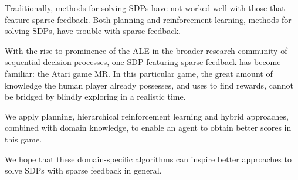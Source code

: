 \newpage
\thispagestyle{empty}
\vfill
{}
Traditionally, methods for solving \acp{SDP} have not
worked well with those that feature sparse feedback. Both planning and
reinforcement learning, methods for solving \acp{SDP}, have trouble with sparse
feedback.

With the rise to prominence of the \ac{ALE} in the
broader research community of sequential decision processes, one \ac{SDP} featuring
sparse feedback has become familiar: the Atari game \acl{MR}. In this
particular game, the great amount of knowledge the human player already
possesses, and uses to find rewards, cannot be bridged by blindly exploring in a
realistic time.

We apply planning, hierarchical reinforcement learning and hybrid approaches,
combined with domain knowledge, to enable an agent to obtain better scores in
this game.

We hope that these domain-specific algorithms can inspire better approaches to
solve \acp{SDP} with sparse feedback in general.
\vfill